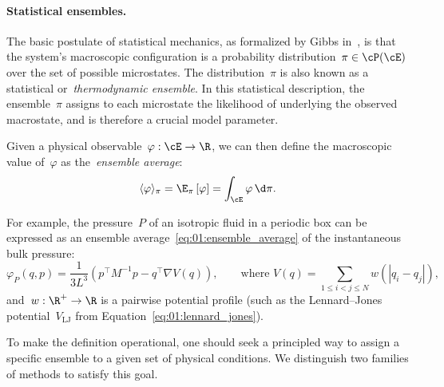 \paragraph{Statistical ensembles.}
The basic postulate of statistical mechanics, as formalized by Gibbs in~\cite{G02}, is that the system's macroscopic configuration is a probability distribution~${\pi\in\cP(\cE)}$ over the set of possible microstates.
The distribution~$\pi$ is also known as a statistical or~\textit{thermodynamic ensemble}. In this statistical description, the ensemble~$\pi$ assigns to each microstate the likelihood of underlying the observed macrostate, and is therefore a crucial model parameter.

Given a physical observable~$\varphi:\cE\to\R$, we can then define the macroscopic value of~$\varphi$ as the~\textit{ensemble average}:
\begin{equation}
    \label{eq:01:ensemble_average}
    \langle \varphi\rangle_{\pi} = \E_\pi\left[\varphi\right]= \int_{\cE}\varphi\,\d \pi.
\end{equation}

For example, the pressure~$P$ of an isotropic fluid in a periodic box can be expressed as an ensemble average~\eqref{eq:01:ensemble_average} of the instantaneous bulk pressure:
\begin{equation}
    \label{eq:01:pressure}
    \varphi_P(q,p) = \frac{1}{3L^3}\left(p^\top M^{-1}p-q^\top\nabla V(q)\right),\qquad\text{where } V(q) = \sum_{1\leq i<j\leq N} w(|q_i-q_j|),
\end{equation}
and~$w:\R^+\to\R$ is a pairwise potential profile (such as the Lennard--Jones potential~$V_{\mathrm{LJ}}$ from Equation~\eqref{eq:01:lennard_jones}).

To make the definition operational, one should seek a principled way to assign a specific ensemble to a given set of physical conditions.
We distinguish two families of methods to satisfy this goal.

